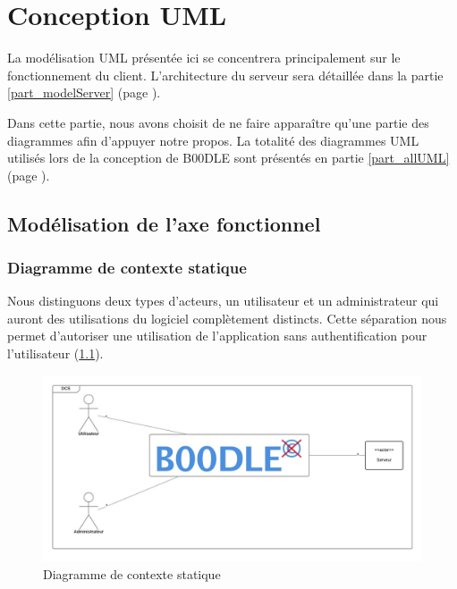 \documentclass[titlepage]{report}
\begin{document}
\clearpage

\chapter{Conception UML}

La modélisation UML présentée ici se concentrera principalement sur le fonctionnement du client. 
L'architecture du serveur sera détaillée dans la partie \ref{part_modelServer} (page \pageref{part_modelServer}). 
\par Dans cette partie, nous avons choisit de ne faire apparaître qu'une partie des diagrammes afin d'appuyer notre propos. 
La totalité des diagrammes UML utilisés lors de la conception de B00DLE sont présentés en partie \ref{part_allUML} (page \pageref{part_allUML}).

\section{Modélisation de l'axe fonctionnel}

\subsection{Diagramme de contexte statique}

Nous distinguons deux types d'acteurs, un utilisateur et un administrateur qui auront des utilisations du logiciel complètement distincts. 
Cette séparation nous permet d'autoriser une utilisation de l'application sans authentification pour l'utilisateur (\ref{diagramme_contexteStatique}). 

\begin{figure}[h]
	\caption{Diagramme de contexte statique}
	\label{diagramme_contexteStatique}
	\centering
	\includegraphics[scale=0.7]{figures/diagrammes/contexteStatique.png}
\end{figure}
\end{document}
